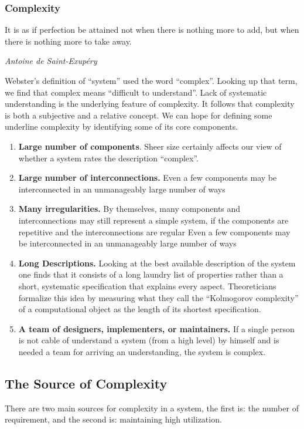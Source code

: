 \documentclass{article}
\begin{document}
  \subsubsection{Complexity}
    \epigraph{It is as if perfection be attained not when there is nothing
      more to add, but when there is nothing more to take away.}{\textit{Antoine de Saint-Exupéry}}
    Webster’s definition of “system” used the word “complex”. Looking up that term, we 
    find that complex means “difficult to understand”. Lack of systematic understanding 
    is the underlying feature of complexity. It follows that complexity is both a subjective 
    and a relative concept. We can hope for defining some underline complexity by identifying 
    some of its core components.
    \begin{enumerate}
      \item \textbf{Large number of components}. Sheer size certainly affects our view of 
        whether a system rates the description “complex”.
      \item \textbf{Large number of interconnections.} Even a few components may be interconnected 
        in an unmanageably large number of ways
      \item \textbf{Many irregularities.} By themselves, many components and interconnections may still represent a 
          simple system, if the components are repetitive and the interconnections are regular
          Even a few components may be interconnected in an unmanageably large number of ways
      \item \textbf{Long Descriptions. }Looking at the best available description of the system 
          one finds that it consists of a long laundry list of properties rather than a short, 
          systematic specification that explains every aspect. Theoreticians formalize this 
          idea by measuring what they call the “Kolmogorov complexity” of a computational 
          object as the length of its shortest specification.
      \item \textbf{A team of designers, implementers, or maintainers. } If a single person is not
          cable of understand a system (from a high level) by himself and is needed a team for arriving
          an understanding, the system is complex.
    \end{enumerate}
  \subsection{The Source of Complexity}
    There are two main sources for complexity in a system, the first is: the number of requirement, and the 
    second is: maintaining high utilization.
\end{document}
